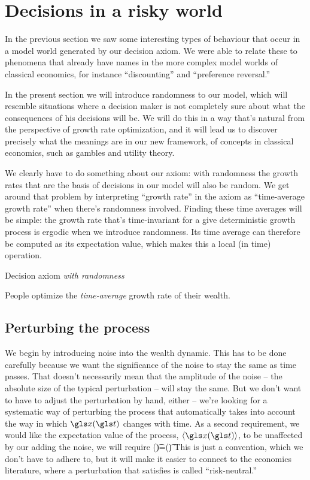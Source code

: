 \chapter{Decisions in a risky world}
In the previous section we saw some interesting types of behaviour that occur in a model world generated by our decision axiom. We were able to relate these to phenomena that already have names in the more complex model worlds of classical economics, for instance ``discounting'' and ``preference reversal.''

In the present section we will introduce randomness to our model, which will resemble situations where a decision maker is not completely sure about what the consequences of his decisions will be. We will do this in a way that's natural from the perspective of growth rate optimization, and it will lead us to discover precisely what the meanings are in our new framework, of concepts in classical economics, such as gambles and utility theory.

We clearly have to do something about our axiom: with randomness the growth rates that are the basis of decisions in our model will also be random. We get around that problem by interpreting ``growth rate'' in the axiom as ``time-average growth rate'' when there's randomness involved. Finding these time averages will be simple: the growth rate that's time-invariant for a give deterministic growth process is ergodic when we introduce randomness. Its time average can therefore be computed as its expectation value, which makes this a local (in time) operation.

\begin{keypts}{Decision axiom {\it with randomness}}

People optimize the {\it time-average} growth rate of their wealth.

\end{keypts}

\section{Perturbing the process}
We begin by introducing noise into the wealth dynamic. This has to be done carefully because we want the significance of the noise to stay the same as time passes. That doesn't necessarily mean that the amplitude of the noise -- the absolute size of the typical perturbation -- will stay the same. But we don't want to have to adjust the perturbation by hand, either -- we're looking for a systematic way of perturbing the process that automatically takes into account the way in which $\x(\t)$ changes with time. As a second requirement, we would like the expectation value of the process, $\ave{\x(\t)}$, to be unaffected by our adding the noise, \ie we will require
\be
\ave{\x}(\t)=\xd(\t)
\ee
This is just a convention, which we don't have to adhere to, but it will make it easier to connect to the economics literature, where a perturbation that satisfies  is called ``risk-neutral.''

